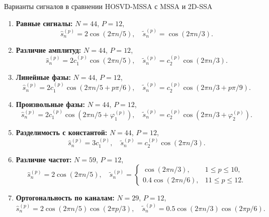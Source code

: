 \documentclass[pdf, unicode, 9pt, notheorems, handout]{beamer}
\begin{document}
    \begin{frame}[noframenumbering]{Варианты сигналов в сравнении HOSVD-MSSA с MSSA и 2D-SSA}
        \begin{enumerate}
            \item \textbf{Равные сигналы:} $N = 44$, $P = 12$,
            \[
                \hat{s}_n^{(p)} = 2 \cos(2 \pi n / 5), \quad \tilde{s}_n^{(p)} = \cos(2\pi n /3).
            \]
            \item \textbf{Различие амплитуд:} $N = 44$, $P = 12$,
            \[
                \hat{s}_n^{(p)} = 2 c_1^{(p)} \cos(2 \pi n / 5), \quad \tilde{s}_n^{(p)} = c_2^{(p)}\cos(2\pi n /3).
            \]
            \item \textbf{Линейные фазы:} $N = 44$, $P = 12$,
            \[
                \hat{s}_n^{(p)} = 2 c_1^{(p)} \cos(2 \pi n / 5 + p \pi / 6),
                \quad \tilde{s}_n^{(p)} = c_2^{(p)}\cos(2\pi n /3 + p \pi / 9).
            \]
            \item \textbf{Произвольные фазы:} $N = 44$, $P = 12$,
            \[
                \hat{s}_n^{(p)} = 2 c_1^{(p)} \cos(2 \pi n / 5 + \varphi_1^{(p)}),
                \quad \tilde{s}_n^{(p)} = c_2^{(p)}\cos(2\pi n /3 + \varphi_2^{(p)}).
            \]
            \item \textbf{Разделимость с константой:} $N = 44$, $P = 12$,
            \[
                \hat{s}_n^{(p)} = 3 c_1^{(p)},
                \quad \tilde{s}_n^{(p)} = c_2^{(p)}\cos(2\pi n /3).
            \]
            \item \textbf{Различие частот:} $N = 59$, $P = 12$,
            \[
                \hat{s}_n^{(p)} = 2 \cos(2 \pi n / 5), \quad
                \tilde{s}_n^{(p)} = \begin{cases}
                    \cos(2\pi n /3), & 1 \leqslant p \leqslant 10,\\
                    0.4 \cos(2 \pi n / 6), & 11 \leqslant p \leqslant 12.
                \end{cases}
            \]
            \item \textbf{Ортогональность по каналам:} $N = 29$, $P = 12$,
            \[
                \hat{s}_n^{(p)} = 2 \cos(2 \pi n / 5) \cos(2 \pi p / 3), \quad
                \tilde{s}_n^{(p)} = 0.5 \cos(2\pi n /3) \cos(2 \pi p / 6).
            \]
        \end{enumerate}
    \end{frame}
\end{document}
